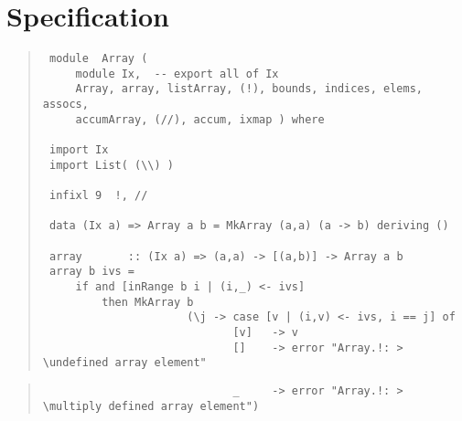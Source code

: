 \section{Specification
}
\begin{quote}
{\haddockverb\begin{verbatim}
 module  Array ( 
     module Ix,  -- export all of Ix 
     Array, array, listArray, (!), bounds, indices, elems, assocs, 
     accumArray, (//), accum, ixmap ) where
 
 import Ix
 import List( (\\) )
 
 infixl 9  !, //
 
 data (Ix a) => Array a b = MkArray (a,a) (a -> b) deriving ()
 
 array       :: (Ix a) => (a,a) -> [(a,b)] -> Array a b
 array b ivs =
     if and [inRange b i | (i,_) <- ivs]
         then MkArray b
                      (\j -> case [v | (i,v) <- ivs, i == j] of
                             [v]   -> v
                             []    -> error "Array.!: >                                            \undefined array element"
\end{verbatim}}
\end{quote}
\begin{quote}
{\haddockverb\begin{verbatim}
                             _     -> error "Array.!: >                                            \multiply defined array element")
\end{verbatim}}
\end{quote}
